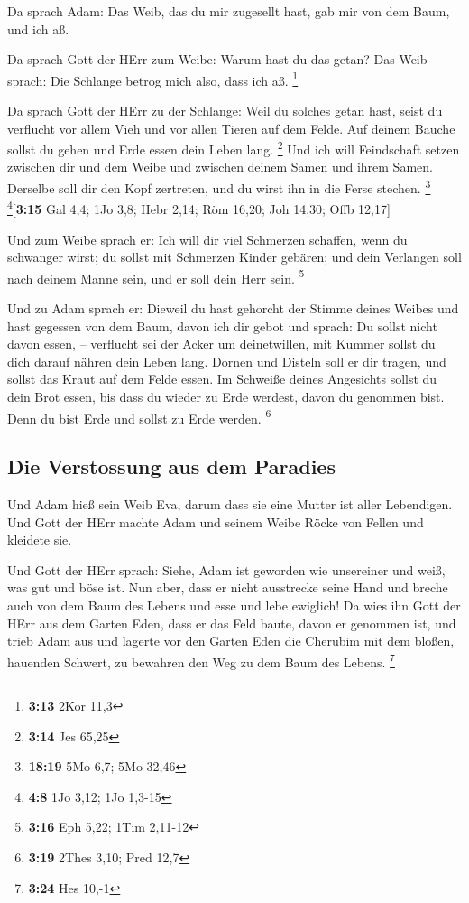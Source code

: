  Da sprach Adam: Das Weib, das du mir zugesellt hast, gab
mir von dem Baum, und ich aß.

 Da sprach Gott der HErr zum Weibe: Warum hast du das
getan? Das Weib sprach: Die Schlange betrog mich also, dass ich aß.
\footnote{\textbf{3:13} 2Kor 11,3}

 Da sprach Gott der HErr zu der Schlange: Weil du solches
getan hast, seist du verflucht vor allem Vieh und vor allen Tieren auf
dem Felde. Auf deinem Bauche sollst du gehen und Erde essen dein Leben
lang. \footnote{\textbf{3:14} Jes 65,25}  Und ich will
Feindschaft setzen zwischen dir und dem Weibe und zwischen deinem Samen
und ihrem Samen. Derselbe soll dir den Kopf zertreten, und du wirst ihn
in die Ferse stechen. \footnote{\textbf{18:19} 5Mo 6,7; 5Mo 32,46}
\footnote{\textbf{4:8} 1Jo 3,12; 1Jo 1,3-15}{[}\textbf{3:15} Gal 4,4;
1Jo 3,8; Hebr 2,14; Röm 16,20; Joh 14,30; Offb 12,17{]}

 Und zum Weibe sprach er: Ich will dir viel Schmerzen
schaffen, wenn du schwanger wirst; du sollst mit Schmerzen Kinder
gebären; und dein Verlangen soll nach deinem Manne sein, und er soll
dein Herr sein. \footnote{\textbf{3:16} Eph 5,22; 1Tim 2,11-12}

 Und zu Adam sprach er: Dieweil du hast gehorcht der
Stimme deines Weibes und hast gegessen von dem Baum, davon ich dir gebot
und sprach: Du sollst nicht davon essen, -- verflucht sei der Acker um
deinetwillen, mit Kummer sollst du dich darauf nähren dein Leben lang.
 Dornen und Disteln soll er dir tragen, und sollst das
Kraut auf dem Felde essen.  Im Schweiße deines Angesichts
sollst du dein Brot essen, bis dass du wieder zu Erde werdest, davon du
genommen bist. Denn du bist Erde und sollst zu Erde werden. \footnote{\textbf{3:19}
  2Thes 3,10; Pred 12,7}

\hypertarget{die-verstossung-aus-dem-paradies}{%
\subsection{Die Verstossung aus dem
Paradies}\label{die-verstossung-aus-dem-paradies}}

 Und Adam hieß sein Weib Eva, darum dass sie eine Mutter
ist aller Lebendigen.  Und Gott der HErr machte Adam und
seinem Weibe Röcke von Fellen und kleidete sie.

 Und Gott der HErr sprach: Siehe, Adam ist geworden wie
unsereiner und weiß, was gut und böse ist. Nun aber, dass er nicht
ausstrecke seine Hand und breche auch von dem Baum des Lebens und esse
und lebe ewiglich!  Da wies ihn Gott der HErr aus dem
Garten Eden, dass er das Feld baute, davon er genommen ist,
 und trieb Adam aus und lagerte vor den Garten Eden die
Cherubim mit dem bloßen, hauenden Schwert, zu bewahren den Weg zu dem
Baum des Lebens. \footnote{\textbf{3:24} Hes 10,-1}

